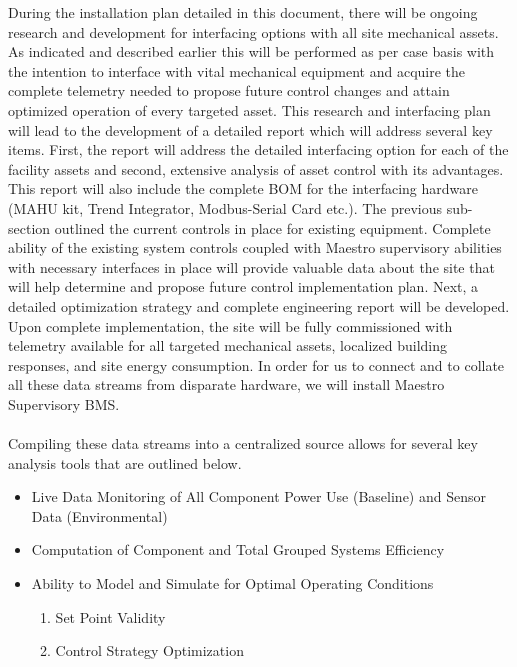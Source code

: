 During the installation plan detailed in this document, there will be ongoing research and development for interfacing options with all site mechanical assets. As indicated and described earlier this will be performed as per case basis with the intention to interface with vital mechanical equipment and acquire the complete telemetry needed to propose future control changes and attain optimized operation of every targeted asset. This research and interfacing plan will lead to the development of a detailed report which will address several key items. First, the report will address the detailed interfacing option for each of the facility assets and second, extensive analysis of asset control with its advantages. This report will also include the complete BOM for the interfacing hardware (MAHU kit, Trend Integrator, Modbus-Serial Card etc.). The previous sub-section outlined the current controls in place for existing equipment. Complete ability of the existing system controls coupled with Maestro supervisory abilities with necessary interfaces in place will provide valuable data about the site that will help determine and propose future control implementation plan. Next, a detailed optimization strategy and complete engineering report will be developed. Upon complete implementation, the site will be fully commissioned with telemetry available for all targeted mechanical assets, localized building responses, and site energy consumption. In order for us to connect and to collate all these data streams from disparate hardware, we will install Maestro Supervisory BMS.
\\
\\
Compiling these data streams into a centralized source allows for several key analysis tools that are outlined below.

\begin{itemize}
  \item  	Live Data Monitoring of All Component Power Use (Baseline) and Sensor Data (Environmental)
  \item		Computation of Component and Total Grouped Systems Efficiency
  \item		Ability to Model and Simulate for Optimal Operating Conditions
  \begin{enumerate}[o]
     \item  	Set Point Validity
     \item		Control Strategy Optimization
   \end{enumerate}
\end{itemize}

